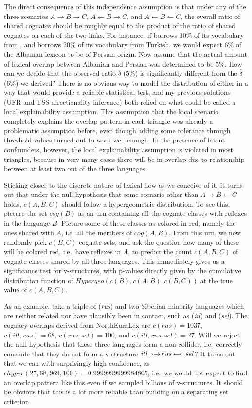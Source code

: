 The direct consequence of this independence assumption is that under any of the three scenarios $A \rightarrow B \rightarrow C$, $A \leftarrow B \rightarrow C$, and $A \leftarrow B \leftarrow C$, the overall ratio of shared cognates should be roughly equal to the product of the ratio of shared cognates on each of the two links. For instance, if  borrows 30\% of its vocabulary from , and  borrows 20\% of its vocabulary from Turkish, we would expect 6\% of the Albanian lexicon to be of Persian origin. Now assume that the actual amount of lexical overlap between Albanian and Persian was determined to be 5\%. How can we decide that the observed ratio $\delta$ (5\%) is significantly different from the $\hat{\delta}$ (6\%) we derived? There is no obvious way to model the distribution of either in a way that would provide a reliable statistical test, and my previous solutions (UFR and TSS directionality inference) both relied on what could be called a local explainability 
assumption. This assumption that the local scenario completely explains the overlap pattern in each triangle was already a problematic assumption before, even though adding some tolerance through threshold values turned out to work well enough. In the presence of latent confounders, however, the local explainability assumption is violated in most triangles, because in very many cases there will be in overlap due to relationship between at least two out of the three languages.

Sticking closer to the discrete nature of lexical flow as we conceive of it, it turns out that under the null hypothesis that some scenario other than $A \rightarrow B \leftarrow C$ holds, $c(A,B,C)$ should follow a hypergeometric distribution. To see this, picture the set $cog(B)$ as an urn containing all the cognate classes with reflexes in the language $B$. Picture some of these classes as colored in red, namely the ones shared with $A$, i.e. all the members of $cog(A,B)$. From this urn, we now randomly pick $c(B,C)$ cognate sets, and ask the question how many of these will be colored red, i.e.\ have reflexes in $A$, to predict the count $c(A,B,C)$ of cognate classes shared by all three languages. This immediately gives us a significance test for v-structures, with p-values directly given by the cumulative distribution function of $Hypergeo(c(B),c(A,B),c(B,C))$ at the true value of $c(A,B,C)$.

As an example, take a triple of  (\textit{rus}) and two Siberian minority languages which are neither related nor have plausibly been in contact, such as  (\textit{itl}) and  (\textit{sel}). The cognacy overlaps derived from NorthEuraLex are $c(rus) = 1037$, $c(itl,rus) = 68$, $c(rus,sel) = 100$, and $c(itl,rus,sel) = 27$. Will we reject the null hypothesis that these three languages form a non-collider, i.e.\ correctly conclude that they do not form a v-structure $itl \arrowOA rus \arrowAO sel$? It turns out that we can with surprisingly high confidence, as $chyper(27, 68, 969, 100) = 0.9999999999984805$, i.e.\ we would not expect to find an overlap pattern like this even if we sampled billions of v-structures. It should be obvious that this is a lot more reliable than building on a separating set criterion.

